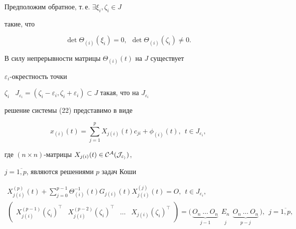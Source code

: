 \begin{pf}
Предположим обратное, т.\,е. $\exists \xi_i, \zeta_i \in J$


такие, что


$$


\det \Theta_{(i)}(\xi_i)=0, \ \ \det \Theta_{(i)}(\zeta_i) \ne 0.


$$





В силу непрерывности матрицы $\Theta_{(i)}(t)$ на $J$ существует


$\varepsilon_i$-окрестность точки


$\zeta_i$ \ $J_{\varepsilon_i}=(\zeta_i- \varepsilon_i,


\zeta_i+ \varepsilon_i) \subset J$ такая, что на $J_{\varepsilon_i}$


решение системы (22) представимо в виде


$$


x_{(i)}(t)=\sum_{j=1}^{p} {X_{j(i)}(t)c_{ji}}+\phi_{(i)}(t),


\ \ t \in J_{\varepsilon_i},


$$


где $(n \times n)$-матрицы $X_{j(i)}(t) \in \cal C^A(J_{\varepsilon_i})$,


$j=\overline{1,p}$, являются решениями $p$ задач Коши


\begin{gather*}


X_{j(i)}^{(p)}(t)+ \sum_{j=0}^{p-1} {\Theta_{(i)}^{-1}(t) G_{j(i)}(t)


X_{j(i)}^{(j)}(t)}=O, \ \ t \in J_{\varepsilon_i},\\


%


\begin{pmatrix}


{X_{j(i)}^{(p-1)}(\zeta_i)}^\top &


{X_{j(i)}^{(p-2)}(\zeta_i)}^\top & \dotsc &


{X_{j(i)}(\zeta_i)}^\top 


\end{pmatrix}= 


\big(\,


\underbrace{O_n \  \dotsc \ O_n}_{j-1}


\ \ \underset{\overset{\phantom{i}}{j}{}}{E_n}


\ \  \underbrace{O_n \ \dotsc \ O_n}_{p-j}\,\big),


\ \ j=\overline{1,p},


\end{gather*}



\end{pf}
